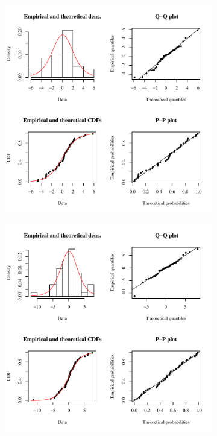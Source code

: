\begin{linenumbers}
\subfiguretop
\begin{landscape}
	\begin{figure}
		\begin{subfigure}{0.7\textwidth}
			\centering
			\includegraphics[width=\tableCustomSize]{"Figures/Results_DSR/Stochastic/Conc Model res-fit D101C"}
		\end{subfigure}%
		\begin{subfigure}{0.7\textwidth}
			\centering
			\includegraphics[width=\tableCustomSize]{"Figures/Results_DSR/Stochastic/Conc Model res-fit D106C"}

\end{subfigure}
\end{figure}
\end{landscape}
\end{linenumbers}
